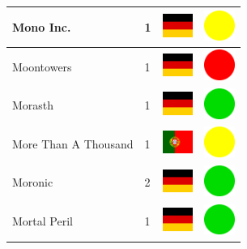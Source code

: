 \documentclass[12pt, a4paper, twoside]{report}
\begin{document}
\begin{center}
\begin{longtable}{|p{5cm}|p{2cm}|p{2cm}|p{2cm}|}
			Mono Inc. & 1 & \includegraphics[width=1cm]{4x3/de} & \includegraphics[width=1cm]{likes/m} \\ \hline
			Moontowers & 1 & \includegraphics[width=1cm]{4x3/de} & \includegraphics[width=1cm]{likes/n} \\ \hline
			Morasth & 1 & \includegraphics[width=1cm]{4x3/de} & \includegraphics[width=1cm]{likes/y} \\ \hline
			More Than A Thousand & 1 & \includegraphics[width=1cm]{4x3/pt} & \includegraphics[width=1cm]{likes/m} \\ \hline
			Moronic & 2 & \includegraphics[width=1cm]{4x3/de} & \includegraphics[width=1cm]{likes/y} \\ \hline
			Mortal Peril & 1 & \includegraphics[width=1cm]{4x3/de} & \includegraphics[width=1cm]{likes/y} \\ \hline

\end{longtable}
\end{center}
\end{document}
